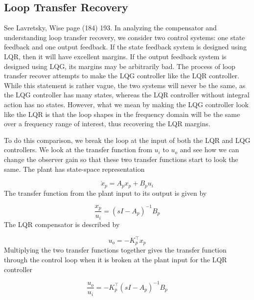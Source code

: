 \subsection{Loop Transfer Recovery}


See Lavretsky, Wise page (184) 193.
In analyzing the compensator and understanding loop transfer recovery, we consider two control systems: one state feedback and one output feedback.
If the state feedback system is designed using LQR, then it will have excellent margins.
If the output feedback system is designed using LQG, its margins may be arbitrarily bad.
The process of loop transfer recover attempts to make the LQG controller like the LQR controller.
While this statement is rather vague, the two systems will never be the same, as the LQG controller has many states, whereas the LQR controller without integral action has no states.
However, what we mean by making the LQG controller look like the LQR is that the loop shapes in the frequency domain will be the same over a frequency range of interest, thus recovering the LQR margins.

To do this comparison, we break the loop at the input of both the LQR and LQG controllers.
We look at the transfer function from $u_{i}$ to $u_{o}$ and see how we can change the observer gain so that these two transfer functions start to look the same.
The plant has state-space representation

\begin{equation*}
  \dot{x}_{p}=A_{p}x_{p}+B_{p}u_{i}
\end{equation*}
The transfer function from the plant input to its output is given by

\begin{equation*}
  \frac{x_{p}}{u_{i}}=(sI-A_{p})^{-1}B_{p}
\end{equation*}
The LQR compensator is described by

\begin{equation*}
  u_{o}=-K_{p}^{\top}x_{p}
\end{equation*}
Multiplying the two transfer functions together gives the transfer function through the control loop when it is broken at the plant input for the LQR controller

\begin{equation*}
  \frac{u_{o}}{u_{i}}=-K_{p}^{\top}(sI-A_{p})^{-1}B_{p}
\end{equation*}

